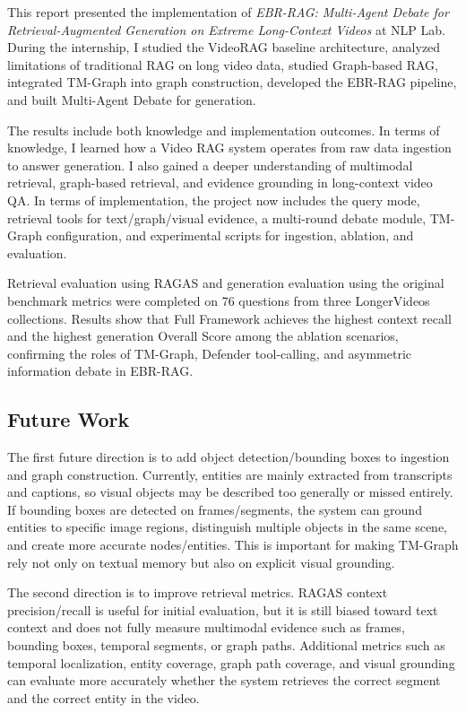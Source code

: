 \documentclass[12pt,a4paper]{article}
\newcommand{\codepath}[1]{\path{#1}}
\begin{document}
This report presented the implementation of \textit{EBR-RAG: Multi-Agent Debate for Retrieval-Augmented Generation on Extreme Long-Context Videos} at NLP Lab. During the internship, I studied the VideoRAG baseline architecture, analyzed limitations of traditional RAG on long video data, studied Graph-based RAG, integrated TM-Graph into graph construction, developed the EBR-RAG pipeline, and built Multi-Agent Debate for generation.

The results include both knowledge and implementation outcomes. In terms of knowledge, I learned how a Video RAG system operates from raw data ingestion to answer generation. I also gained a deeper understanding of multimodal retrieval, graph-based retrieval, and evidence grounding in long-context video QA. In terms of implementation, the project now includes the \codepath{EBR_RAG} query mode, retrieval tools for text/graph/visual evidence, a multi-round debate module, TM-Graph configuration, and experimental scripts for ingestion, ablation, and evaluation.

Retrieval evaluation using RAGAS and generation evaluation using the original benchmark metrics were completed on 76 questions from three LongerVideos collections. Results show that Full Framework achieves the highest context recall and the highest generation Overall Score among the ablation scenarios, confirming the roles of TM-Graph, Defender tool-calling, and asymmetric information debate in EBR-RAG.

\subsection{Future Work}

The first future direction is to add object detection/bounding boxes to ingestion and graph construction. Currently, entities are mainly extracted from transcripts and captions, so visual objects may be described too generally or missed entirely. If bounding boxes are detected on frames/segments, the system can ground entities to specific image regions, distinguish multiple objects in the same scene, and create more accurate nodes/entities. This is important for making TM-Graph rely not only on textual memory but also on explicit visual grounding.

The second direction is to improve retrieval metrics. RAGAS context precision/recall is useful for initial evaluation, but it is still biased toward text context and does not fully measure multimodal evidence such as frames, bounding boxes, temporal segments, or graph paths. Additional metrics such as temporal localization, entity coverage, graph path coverage, and visual grounding can evaluate more accurately whether the system retrieves the correct segment and the correct entity in the video.
\end{document}
